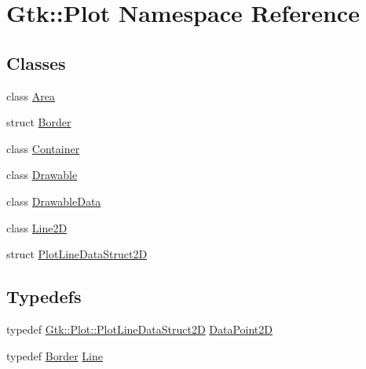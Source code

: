 \hypertarget{namespaceGtk_1_1Plot}{
\section{Gtk::Plot Namespace Reference}
\label{namespaceGtk_1_1Plot}
}
\subsection*{Classes}
\begin{DoxyCompactItemize}
\item 
class \hyperlink{classGtk_1_1Plot_1_1Area}{Area}
\item 
struct \hyperlink{structGtk_1_1Plot_1_1Border}{Border}
\item 
class \hyperlink{classGtk_1_1Plot_1_1Container}{Container}
\item 
class \hyperlink{classGtk_1_1Plot_1_1Drawable}{Drawable}
\item 
class \hyperlink{classGtk_1_1Plot_1_1DrawableData}{DrawableData}
\item 
class \hyperlink{classGtk_1_1Plot_1_1Line2D}{Line2D}
\item 
struct \hyperlink{structGtk_1_1Plot_1_1PlotLineDataStruct2D}{PlotLineDataStruct2D}
\end{DoxyCompactItemize}
\subsection*{Typedefs}
\begin{DoxyCompactItemize}
\item 
typedef \hyperlink{structGtk_1_1Plot_1_1PlotLineDataStruct2D}{Gtk::Plot::PlotLineDataStruct2D} \hyperlink{namespaceGtk_1_1Plot_abea92d3a790b1bcf6a64f98511231815}{DataPoint2D}
\item 
typedef \hyperlink{structGtk_1_1Plot_1_1Border}{Border} \hyperlink{namespaceGtk_1_1Plot_a9b9ee0ab9bbec47945b0bf70f30ea308}{Line}
\end{DoxyCompactItemize}
